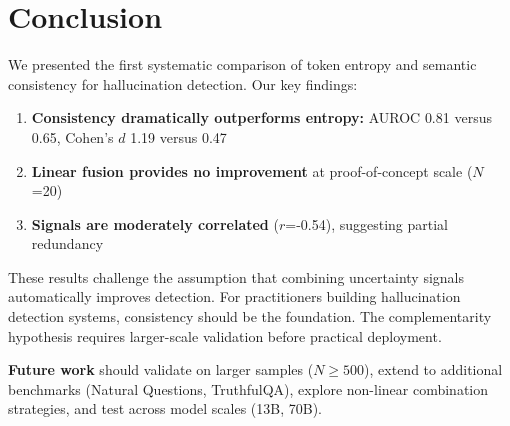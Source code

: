 \section{Conclusion}

We presented the first systematic comparison of token entropy and semantic consistency for hallucination detection. Our key findings:

\begin{enumerate}
    \item \textbf{Consistency dramatically outperforms entropy:} AUROC 0.81 versus 0.65, Cohen's $d$ 1.19 versus 0.47
    \item \textbf{Linear fusion provides no improvement} at proof-of-concept scale ($N$=20)
    \item \textbf{Signals are moderately correlated} ($r$=-0.54), suggesting partial redundancy
\end{enumerate}

These results challenge the assumption that combining uncertainty signals automatically improves detection. For practitioners building hallucination detection systems, consistency should be the foundation. The complementarity hypothesis requires larger-scale validation before practical deployment.

\textbf{Future work} should validate on larger samples ($N \geq 500$), extend to additional benchmarks (Natural Questions, TruthfulQA), explore non-linear combination strategies, and test across model scales (13B, 70B).
